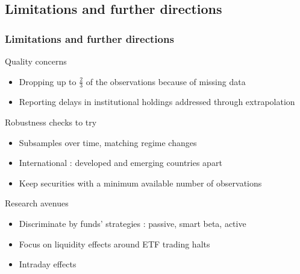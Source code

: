\documentclass[9pt, usenames, dvipsnames]{beamer}
\begin{document}
\subsection{Limitations and further directions}
\begin{frame}
  \frametitle{Limitations and further directions}
  \begin{block}{Quality concerns}
    \begin{itemize}
    \item Dropping up to $\frac{2}{3}$ of the observations because of missing data
      \item Reporting delays in institutional holdings addressed through extrapolation
      \end{itemize}
  \end{block}
  \begin{block}{Robustness checks to try}
  \begin{itemize}
    \item Subsamples over time, matching regime changes
    \item International : developed and emerging countries apart
      \item Keep securities with a minimum available number of observations
  \end{itemize}
\end{block}
\begin{block}{Research avenues}
  \begin{itemize}
    \item Discriminate by funds' strategies : passive, smart beta, active
  \item Focus on liquidity effects around ETF trading halts
    \item Intraday effects
  \end{itemize}
  \end{block}
\end{frame}
\end{document}
